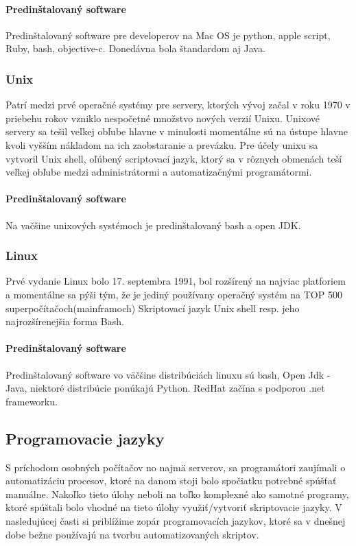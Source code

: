 \paragraph{Predinštalovaný software}
\indent Predinštalovaný software pre developerov na Mac OS je python, apple script, Ruby, bash, objective-c. Donedávna bola štandardom aj Java.

\subsubsection{Unix}
\indent Patrí medzi prvé operačné systémy pre servery, ktorých vývoj začal v roku 1970 v priebehu rokov vzniklo nespočetné množstvo nových verzií Unixu. Unixové servery sa tešil veľkej obľube hlavne v minulosti momentálne sú na ústupe hlavne kvoli vyšším nákladom na ich zaobstaranie a prevázku. Pre účely unixu sa vytvoril Unix shell, oľúbený scriptovací jazyk, ktorý sa v rôznych obmenách teší veľkej obľube medzi administrátormi a automatizačnými programátormi.
\paragraph{Predinštalovaný software}
\indent Na vačšine unixových systémoch je predinštalovaný bash a open JDK.
\newline
\subsubsection{Linux}
\indent  Prvé vydanie Linux  bolo 17. septembra 1991, bol rozšírený na najviac platforiem a momentálne sa pýši tým, že je jediný používany operačný systém na TOP 500 superpočítačoch(mainframoch) Skriptovací jazyk Unix shell resp. jeho najrozšírenejšia forma Bash.
\paragraph{Predinštalovaný software}
\indent Predinštalovaný software vo väčšine distribúciách linuxu sú bash, Open Jdk - Java, niektoré distribúcie ponúkajú Python. RedHat začína s podporou .net frameworku.
\newline
\subsection{Programovacie jazyky}
\indent S príchodom osobných počítačov no najmä serverov, sa programátori zaujímali o automatizáciu procesov, ktoré na danom stoji bolo spočiatku potrebné spúšťať manuálne. Nakoľko tieto úlohy neboli na toľko komplexné ako samotné programy, ktoré spúštali bolo vhodné na tieto úlohy využiť/vytvoriť skriptovacie jazyky. V nasledujúcej časti si priblížime zopár programovacích jazykov, ktoré sa v dnešnej dobe bežne používajú na tvorbu automatizovaných skriptov.

